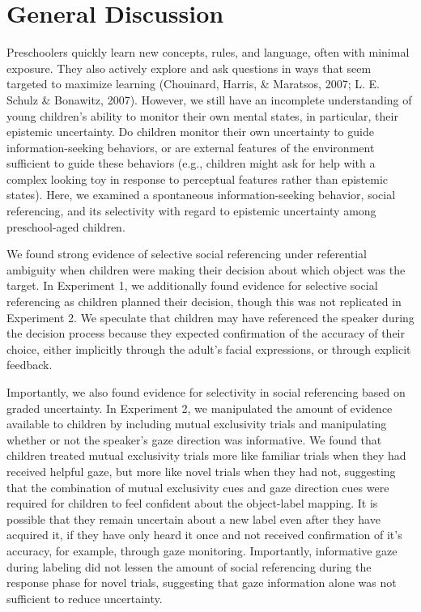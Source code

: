 \documentclass[10pt, letterpaper]{article}
\begin{document}
\section{General Discussion}\label{general-discussion}

Preschoolers quickly learn new concepts, rules, and language, often with
minimal exposure. They also actively explore and ask questions in ways
that seem targeted to maximize learning (Chouinard, Harris, \& Maratsos,
2007; L. E. Schulz \& Bonawitz, 2007). However, we still have an
incomplete understanding of young children's ability to monitor their
own mental states, in particular, their epistemic uncertainty. Do
children monitor their own uncertainty to guide information-seeking
behaviors, or are external features of the environment sufficient to
guide these behaviors (e.g., children might ask for help with a complex
looking toy in response to perceptual features rather than epistemic
states). Here, we examined a spontaneous information-seeking behavior,
social referencing, and its selectivity with regard to epistemic
uncertainty among preschool-aged children.

We found strong evidence of selective social referencing under
referential ambiguity when children were making their decision about
which object was the target. In Experiment 1, we additionally found
evidence for selective social referencing as children planned their
decision, though this was not replicated in Experiment 2. We speculate
that children may have referenced the speaker during the decision
process because they expected confirmation of the accuracy of their
choice, either implicitly through the adult's facial expressions, or
through explicit feedback.

Importantly, we also found evidence for selectivity in social
referencing based on graded uncertainty. In Experiment 2, we manipulated
the amount of evidence available to children by including mutual
exclusivity trials and manipulating whether or not the speaker's gaze
direction was informative. We found that children treated mutual
exclusivity trials more like familiar trials when they had received
helpful gaze, but more like novel trials when they had not, suggesting
that the combination of mutual exclusivity cues and gaze direction cues
were required for children to feel confident about the object-label
mapping. It is possible that they remain uncertain about a new label
even after they have acquired it, if they have only heard it once and
not received confirmation of it's accuracy, for example, through gaze
monitoring. Importantly, informative gaze during labeling did not lessen
the amount of social referencing during the response phase for novel
trials, suggesting that gaze information alone was not sufficient to
reduce uncertainty.
\end{document}

